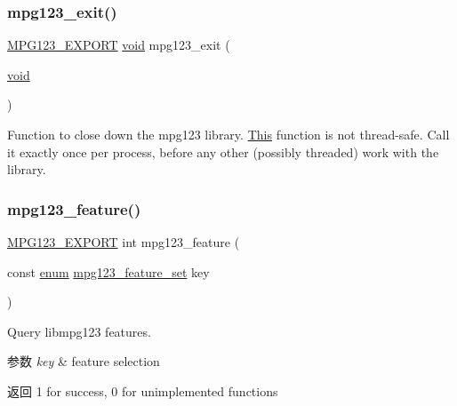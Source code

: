 \subsubsection{\texorpdfstring{mpg123\+\_\+exit()}{mpg123\_exit()}}
{\footnotesize\ttfamily \hyperlink{mpg123_8h_a2ba98cfba3f760879df70e755b2a61cc}{M\+P\+G123\+\_\+\+E\+X\+P\+O\+RT} \hyperlink{interfacevoid}{void} mpg123\+\_\+exit (\begin{DoxyParamCaption}\item[{\hyperlink{interfacevoid}{void}}]{ }\end{DoxyParamCaption})}

Function to close down the mpg123 library. \hyperlink{namespace_this}{This} function is not thread-\/safe. Call it exactly once per process, before any other (possibly threaded) work with the library. \mbox{\label{group__mpg123__init_gaf9b00e4fc7273c0d5e41d6d490606d56}} 
\subsubsection{\texorpdfstring{mpg123\+\_\+feature()}{mpg123\_feature()}}
{\footnotesize\ttfamily \hyperlink{mpg123_8h_a2ba98cfba3f760879df70e755b2a61cc}{M\+P\+G123\+\_\+\+E\+X\+P\+O\+RT} int mpg123\+\_\+feature (\begin{DoxyParamCaption}\item[{const \hyperlink{interfaceenum}{enum} \hyperlink{group__mpg123__init_gab26f1b8c3289847f5928176a20b4c942}{mpg123\+\_\+feature\+\_\+set}}]{key }\end{DoxyParamCaption})}

Query libmpg123 features. 
\begin{DoxyParams}{参数}
{\em key} & feature selection \\
\hline
\end{DoxyParams}
\begin{DoxyReturn}{返回}
1 for success, 0 for unimplemented functions 
\end{DoxyReturn}
\mbox{\label{group__mpg123__init_ga2b742bb1eecc9d29a09aa9a7f69b52af}} 
